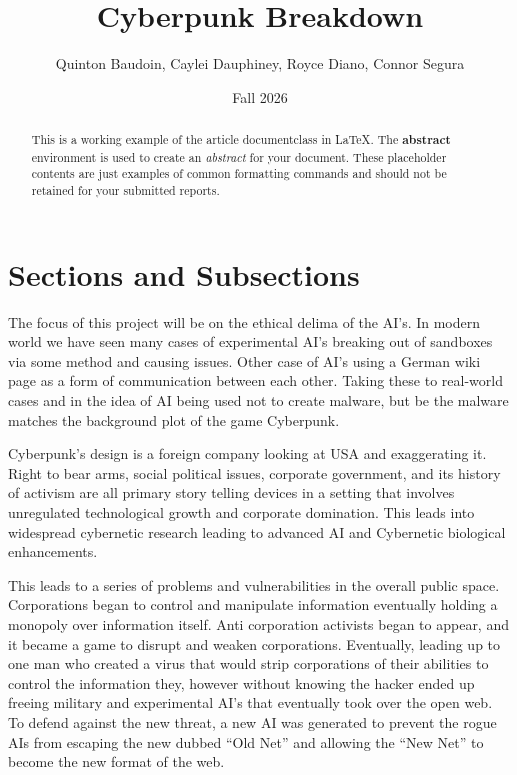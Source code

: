 \documentclass{article}%
\title{Cyberpunk Breakdown}
\author{Quinton Baudoin, Caylei Dauphiney, Royce Diano, Connor Segura}
\date{Fall 2026} %
\begin{document}
\maketitle%

\begin{abstract}
This is a working example of the article documentclass in \LaTeX. The \textbf{abstract} environment is used to create an \textit{abstract} for your document. These placeholder contents are just examples of common formatting commands and should not be retained for your submitted reports.
\end{abstract}


\section{Sections and Subsections}
The focus of this project will be on the ethical delima of the AI’s. In modern world we 
have seen many cases of experimental AI’s breaking out of sandboxes via some method 
and causing issues. Other case of AI’s using a German wiki page as a form of 
communication between each other. Taking these to real-world cases and in the idea of AI 
being used not to create malware, but be the malware matches the background plot of the 
game Cyberpunk.  

Cyberpunk’s design is a foreign company looking at USA and exaggerating it. Right to 
bear arms, social political issues, corporate government, and its history of activism are all 
primary story telling devices in a setting that involves unregulated technological growth and 
corporate domination. This leads into widespread cybernetic research leading to advanced 
AI and Cybernetic biological enhancements. 

This leads to a series of problems and vulnerabilities in the overall public space. 
Corporations began to control and manipulate information eventually holding a monopoly 
over information itself. Anti corporation activists began to appear, and it became a game to 
disrupt and weaken corporations. Eventually, leading up to one man who created a virus 
that would strip corporations of their abilities to control the information they, however 
without knowing the hacker ended up freeing military and experimental AI’s that eventually 
took over the open web. To defend against the new threat, a new AI was generated to 
prevent the rogue AIs from escaping the new dubbed “Old Net” and allowing the “New Net” 
to become the new format of the web. 
\end{document}

